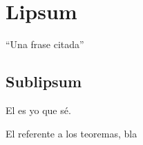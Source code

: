 \chapter{Lipsum}\label{cap:lipsum}
\enquote{Una frase citada}
\lipsum
\section{Sublipsum}\label{sec:sublipsum}
El  es yo que sé.

\lipsum

El  referente a los teoremas, bla


\endinput